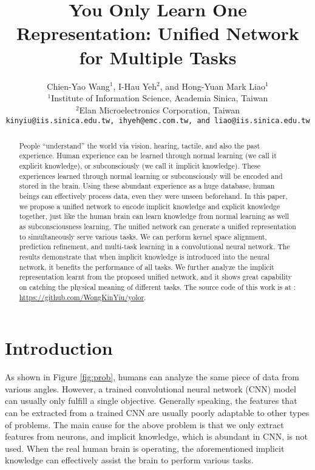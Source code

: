 \documentclass[10pt,twocolumn,letterpaper]{article}
\begin{document}
\title{You Only Learn One Representation: Unified Network for Multiple Tasks}

\author{Chien-Yao Wang$^{1}$, I-Hau Yeh$^{2}$, and Hong-Yuan Mark Liao$^{1}$ \\
	$^{1}$Institute of Information Science, Academia Sinica, Taiwan\\
	$^{2}$Elan Microelectronics Corporation, Taiwan\\
	{\tt\small kinyiu@iis.sinica.edu.tw, ihyeh@emc.com.tw, and liao@iis.sinica.edu.tw}
}

\maketitle


\begin{abstract}
	People ``understand'' the world via vision, hearing, tactile, and also the past experience. Human experience can be learned through normal learning (we call it explicit knowledge), or subconsciously (we call it implicit knowledge). These experiences learned through normal learning or subconsciously will be encoded and stored in the brain. Using these abundant experience as a huge database, human beings can effectively process data, even they were unseen beforehand. In this paper, we propose a unified network to encode implicit knowledge and explicit knowledge together, just like the human brain can learn knowledge from normal learning as well as subconsciousness learning. The unified network can generate a unified representation to simultaneously serve various tasks. We can perform kernel space alignment, prediction refinement, and multi-task learning in a convolutional neural network. The results demonstrate that when implicit knowledge is introduced into the neural network, it benefits the performance of all tasks. We further analyze the implicit representation learnt from the proposed unified network, and it shows great capability on catching the physical meaning of different tasks. The source code of this work is at : \url{https://github.com/WongKinYiu/yolor}.
\end{abstract}

\section{Introduction}

As shown in Figure \ref{fig:prob}, humans can analyze the same piece of data from various angles. However, a trained convolutional neural network (CNN) model can usually only fulfill a single objective. Generally speaking, the features that can be extracted from a trained CNN are usually poorly adaptable to other types of problems. The main cause for the above problem is that we only extract features from neurons, and implicit knowledge, which is abundant in CNN, is not used. When the real human brain is operating, the aforementioned implicit knowledge can effectively assist the brain to perform various tasks.
\end{document}
